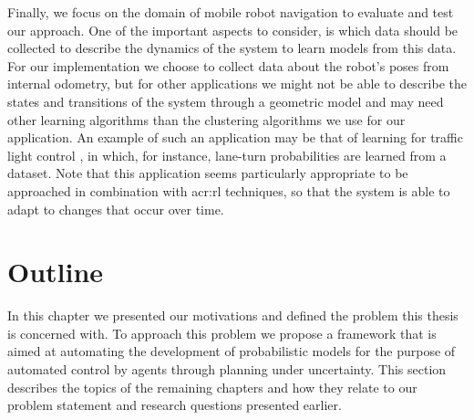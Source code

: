 Finally, we focus on the domain of mobile robot navigation to evaluate and test our approach.
One of the important aspects to consider, is which data should be collected to describe the dynamics of the system to learn models from this data.
For our implementation we choose to collect data about the robot's poses from internal odometry, but for other applications we might not be able to describe the states and transitions of the system through a geometric model and may need other learning algorithms than the clustering algorithms we use for our application.
An example of such an application may be that of learning  for traffic light control \cite{wiering2004intelligent, delgado2011efficient}, in which, for instance, lane-turn probabilities are learned from a dataset.
Note that this application seems particularly appropriate to be approached in combination with \acrshort{acr:rl} techniques, so that the system is able to adapt to changes that occur over time.


\section{Outline}
\label{sec:introduction-outline}

In this chapter we presented our motivations and defined the problem this thesis is concerned with.
To approach this problem we propose a framework that is aimed at automating the development of probabilistic models for the purpose of automated control by agents through planning under uncertainty.
This section describes the topics of the remaining chapters and how they relate to our problem statement and research questions presented earlier.

